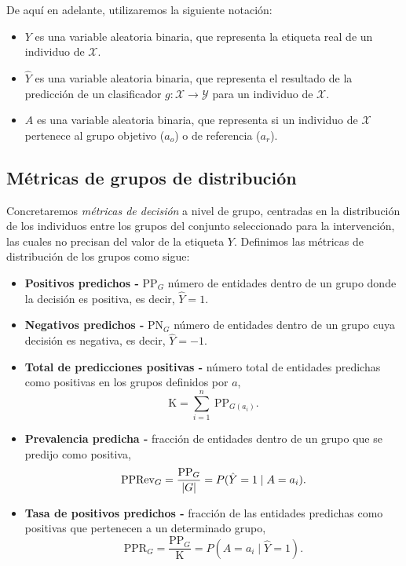 \documentclass[oneside,openright,titlepage,numbers=noenddot,openany,headinclude,footinclude=true,
cleardoublepage=empty,abstractoff,BCOR=5mm,paper=a4,fontsize=12pt,main=spanish]{scrreprt}
\begin{document}
\clearpage

\begin{notation}
De aquí en adelante, utilizaremos la siguiente notación:

\begin{itemize}
    \item $Y$ es una variable aleatoria binaria, que representa la etiqueta real de un individuo de $\mathcal{X}.$
    \item $\hat{Y}$ es una variable aleatoria binaria, que representa el resultado de la predicción de un clasificador $g\colon \mathcal{X} \to \mathcal{Y}$ para un individuo de $\mathcal{X}.$
    \item $A$ es una variable aleatoria binaria, que representa si un individuo de $\mathcal{X}$ pertenece al grupo objetivo ($a_o$) o de referencia ($a_r$).
\end{itemize}
\end{notation}

\subsection*{Métricas de grupos de distribución}

Concretaremos \textit{métricas de decisión} a nivel de grupo, centradas en la distribución de los individuos entre los grupos del conjunto seleccionado para la intervención, las cuales no precisan del valor de la etiqueta $Y$. Definimos las métricas de distribución de los grupos como sigue:

\begin{itemize}
    \item \textbf{Positivos predichos -} PP$_G$ número de entidades dentro de un grupo donde la decisión es positiva, es decir, $\hat{Y} = 1$.
    \item \textbf{Negativos predichos -} PN$_G$ número de entidades dentro de un grupo cuya decisión es negativa, es decir, $\hat{Y} = -1$.
    \item \textbf{Total de predicciones positivas -} número total de entidades predichas como positivas en los grupos definidos por $a$, $$\text{K} = \sum_{i=1}^{n} \  \text{PP}_{G(a_i)}.$$
    \item \textbf{Prevalencia predicha -} fracción de entidades dentro de un grupo que se predijo como positiva, $$\text{PPRev}_G = \frac{\text{PP}_G}{\left\lvert G\right\rvert} = P(\hat{Y}=1 \mid A=a_i).$$
    \item \textbf{Tasa de positivos predichos -} fracción de las entidades predichas como positivas que pertenecen a un determinado grupo, $$\text{PPR}_G = \frac{\text{PP}_G}{\text{K}} = P(A=a_i \mid \hat{Y}=1).$$
\end{itemize}
\end{document}
